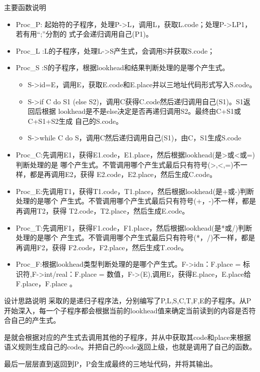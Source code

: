 \documentclass[aspectratio=1610]{ctexbeamer}
\begin{document}
\begin{frame}[allowframebreaks]{主要函数说明}
    \begin{itemize}
        \item Proc_P: 起始符的子程序，处理P->L，调用L，获取L.code；处理P->LP1，若有用“;”分割的	式子会递归调用自己(P1)。
        \item Proc_L :L的子程序，处理L->S产生式，会调用S并获取S.code；
        \item Proc_S :S的子程序，根据lookhead和结果判断处理的是哪个产生式。
          \begin{itemize}
            \item S->id=E，调用E，获取E.code和E.place并以三地址代码形式写入S.code。
            \item S->if C do S1 (else S2)，调用C获得C.code然后递归调用自己(S1)。S1返回后根据			lookhead是不是else决定是否再递归调用S2。最终由C+S1或C+S1+S2生成			自己的S.code。
            \item S->while C do S，调用C然后递归调用自己(S1)，由C，S1生成S.code
          \end{itemize}
          \item  Proc_C:先调用E1，获得E1.code，E1.place，然后根据lookhead(是>或<或=)判断处理的是	哪个产生式。不管调用哪个产生式最后只有符号(>,<,=)不一样，都是再调用E2，获得	E2.code，E2.place，然后生成C.code。
          \item   Proc_E:先调用T1，获得T1.code，T1.place，然后根据lookhead(是+或-)判断处理的是哪个	产生式。不管调用哪个产生式最后只有符号(+，-)不一样，都是再调用T2，获得	T2.code，T2.place，然后生成E.code。
          \item   Proc_T:先调用F1，获得F1.code，F1.place，然后根据lookhead(是*或/)判断处理的是哪个	产生式。不管调用哪个产生式最后只有符号(*，/)不一样，都是再调用F2，获得	F2.code，F2.place，然后生成T.code。
          \item   Proc_F:根据lookhead类型判断处理的是哪个产生式。F->idn：F.place = 标识符,F->int/real：F.place = 数值，F->(E),调用E，获得E.place，E.place给F.place，F.place 。
    \end{itemize}
\end{frame}

\begin{frame}{设计思路说明}
    采取的是递归子程序法，分别编写了P,L,S,C,T,F,E的子程序。从P开始深入，每一个子程序都会根据当前的lookhead值来确定当前读到的内容是否符合自己的产生式。
    
    是就会根据对应的产生式去调用其他的子程序，并从中获取其code和place来根据语义规则生成自己的code。并把自己的code返回上级，也就是调用了自己的函数。
    
    最后一层层直到返回到P，P会生成最终的三地址代码，并将其输出。
\end{frame}
\end{document}
